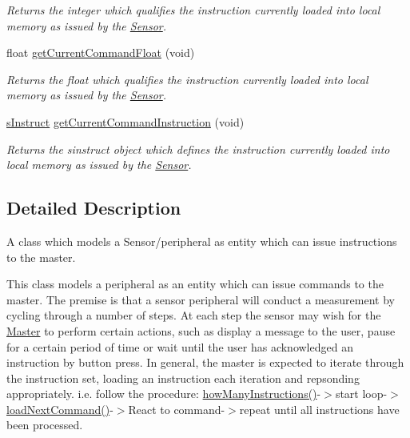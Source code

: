 \begin{DoxyCompactItemize}
\begin{DoxyCompactList}\small\item\em Returns the integer which qualifies the instruction currently loaded into local memory as issued by the \mbox{\hyperlink{class_sensor}{Sensor}}. \end{DoxyCompactList}\item 
float \mbox{\hyperlink{class_instructor_ae81f8123893b582fd32a71601471cff8}{get\+Current\+Command\+Float}} (void)
\begin{DoxyCompactList}\small\item\em Returns the float which qualifies the instruction currently loaded into local memory as issued by the \mbox{\hyperlink{class_sensor}{Sensor}}. \end{DoxyCompactList}\item 
\mbox{\hyperlink{_s_p_i___instruction_set_8h_a949ec019a0f52780dcdd7d5a5ba73e47}{s\+Instruct}} \mbox{\hyperlink{class_instructor_a1e54d05ded7ecf88f0205b52901df681}{get\+Current\+Command\+Instruction}} (void)
\begin{DoxyCompactList}\small\item\em Returns the sinstruct object which defines the instruction currently loaded into local memory as issued by the \mbox{\hyperlink{class_sensor}{Sensor}}. \end{DoxyCompactList}\end{DoxyCompactItemize}


\subsection{Detailed Description}
A class which models a Sensor/peripheral as entity which can issue instructions to the master. 

This class models a peripheral as an entity which can issue commands to the master. The premise is that a sensor peripheral will conduct a measurement by cycling through a number of steps. At each step the sensor may wish for the \mbox{\hyperlink{class_master}{Master}} to perform certain actions, such as display a message to the user, pause for a certain period of time or wait until the user has acknowledged an instruction by button press. In general, the master is expected to iterate through the instruction set, loading an instruction each iteration and repsonding appropriately. i.\+e. follow the procedure\+: \mbox{\hyperlink{class_instructor_abfe73e27d6364bf5cad80f30f6833ec8}{how\+Many\+Instructions()}}-\/$>$start loop-\/$>$\mbox{\hyperlink{class_instructor_a43cbe18547a30108219f3aa2945fc9ca}{load\+Next\+Command()}}-\/$>$React to command-\/$>$repeat until all instructions have been processed. 

